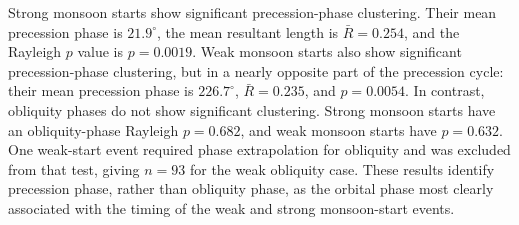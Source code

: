 \documentclass[11pt]{article}
\begin{document}
Strong monsoon starts show significant precession-phase clustering. Their mean precession phase is \(21.9^\circ\), the mean resultant length is \(\bar{R}=0.254\), and the Rayleigh \(p\) value is \(p=0.0019\). Weak monsoon starts also show significant precession-phase clustering, but in a nearly opposite part of the precession cycle: their mean precession phase is \(226.7^\circ\), \(\bar{R}=0.235\), and \(p=0.0054\). In contrast, obliquity phases do not show significant clustering. Strong monsoon starts have an obliquity-phase Rayleigh \(p=0.682\), and weak monsoon starts have \(p=0.632\). One weak-start event required phase extrapolation for obliquity and was excluded from that test, giving \(n=93\) for the weak obliquity case. These results identify precession phase, rather than obliquity phase, as the orbital phase most clearly associated with the timing of the weak and strong monsoon-start events.
\end{document}
